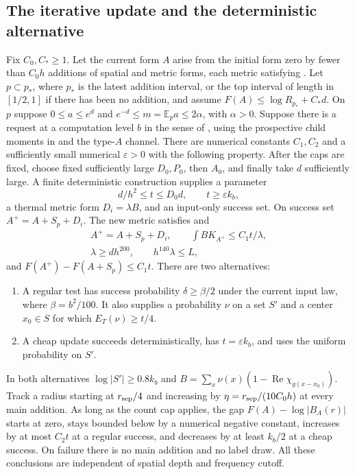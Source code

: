 \subsection{The iterative update and the deterministic alternative}

\begin{lemma}\label{lemma:spectral-update}
Fix $C_0,C_*\ge1$.  Let the current form $A$ arise from the initial
form zero by fewer than $C_0h$ additions of spatial and metric forms,
each metric satisfying .  Let $p\subset p_*$, where
$p_*$ is the latest addition interval, or the top interval of length in
$[1/2,1]$ if there has been no addition, and assume
$F(A)\le\log R_{p_*}+C_*d$.  On $p$ suppose
$0\le a\le e^d$ and $e^{-d}\le m=\mathbb E_pa\le2\alpha$, with
$\alpha>0$.  Suppose there is a request at a computation level $b$ in
the sense of , using the prospective child
moments in  and the type-$A$ channel.
There are numerical constants $C_1,C_2$
and a sufficiently small numerical $\varepsilon>0$ with the following
property.  After the caps are fixed, choose fixed sufficiently large
$D_0,P_0$, then $A_0$, and finally take $d$ sufficiently large.
A finite deterministic construction supplies a parameter
\[
 d/h^2\le t\le D_0d,\qquad t\ge\varepsilon k_b,
\]
a thermal metric form $D_i=\lambda B$, and an input-only success set.
On success set $A^+=A+S_p+D_i$.  The new metric satisfies
 and
\begin{equation}\label{eq:source-9}
 \begin{gathered}
 A^+=A+S_p+D_i,\qquad \int B K_{A^+}\le C_1t/\lambda,\\
 \lambda\ge dh^{200},\qquad h^{140}\lambda\le L,
 \end{gathered}
\end{equation}
and $F(A^+)-F(A+S_p)\le C_1t$.
There are two alternatives:
\begin{enumerate}[label=\textup{(\roman*)}]
 \item A regular test has success probability $\delta\ge\beta/2$ under
 the current input law, where $\beta=b^2/100$.  It also supplies a
 probability $\nu$ on a set $S'$ and a center $x_0\in S$ for which
 $E_T(\nu)\ge t/4$.
 \item A cheap update succeeds deterministically, has
 $t=\varepsilon k_b$, and uses the uniform probability on $S'$.
\end{enumerate}
In both alternatives $\log|S'|\ge0.8k_b$ and
$B=\sum_x\nu(x)(1-\operatorname{Re}\chi_{g(x-x_0)})$.
Track a radius starting at $r_{\rm sep}/4$ and increasing by
$\eta=r_{\rm sep}/(10C_0h)$ at every main addition.  As long as the
count cap applies, the gap $F(A)-\log|B_A(r)|$ starts at zero, stays
bounded below by a numerical negative constant, increases by at most
$C_2t$ at a regular success, and decreases by at least $k_b/2$ at a
cheap success.  On failure there is no main addition and no label draw.
All these conclusions are independent of spatial depth and frequency
cutoff.
\end{lemma}

